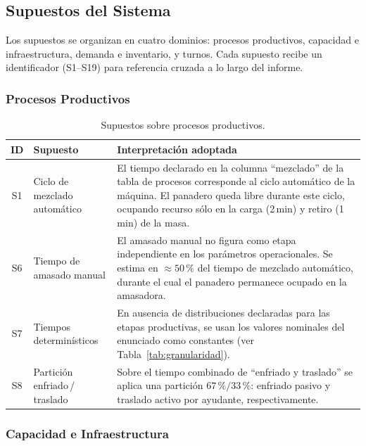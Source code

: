 \documentclass[10pt, a4paper]{article}
\begin{document}
\subsection{Supuestos del Sistema}
\label{ssec:supuestos_sistema}

Los supuestos se organizan en cuatro dominios: procesos productivos,
capacidad e infraestructura, demanda e inventario, y turnos. Cada supuesto
recibe un identificador (S1--S19) para referencia cruzada a lo largo del
informe.

\subsubsection{Procesos Productivos}

\begin{table}[H]
\centering
\caption{Supuestos sobre procesos productivos.}
\label{tab:supuestos_proc}
\renewcommand{\arraystretch}{1.30}
\begin{tabularx}{\textwidth}{c >{\raggedright\arraybackslash}p{3.5cm} X}
\toprule
\rowcolor{azulClaro}
\textbf{ID} & \textbf{Supuesto} & \textbf{Interpretaci\'on adoptada} \\
\midrule
S1 & Ciclo de mezclado autom\'atico
   & El tiempo declarado en la columna ``mezclado'' de la tabla de procesos
     corresponde al ciclo autom\'atico de la m\'aquina. El panadero queda
     libre durante este ciclo, ocupando recurso s\'olo en la carga (2\,min) y
     retiro (1\,min) de la masa. \\
\rowcolor{grisClaro}
S6 & Tiempo de amasado manual
   & El amasado manual no figura como etapa independiente en los par\'ametros
     operacionales. Se estima en $\approx 50\,\%$ del tiempo de mezclado
     autom\'atico, durante el cual el panadero permanece ocupado en la
     amasadora. \\
S7 & Tiempos determin\'isticos
   & En ausencia de distribuciones declaradas para las etapas productivas,
     se usan los valores nominales del enunciado como constantes (ver
     Tabla~\ref{tab:granularidad}). \\
\rowcolor{grisClaro}
S8 & Partici\'on enfriado\,/\,traslado
   & Sobre el tiempo combinado de ``enfriado y traslado'' se aplica una
     partici\'on $67\,\% / 33\,\%$: enfriado pasivo y traslado activo por
     ayudante, respectivamente. \\
\bottomrule
\end{tabularx}
\end{table}

\subsubsection{Capacidad e Infraestructura}
\end{document}
